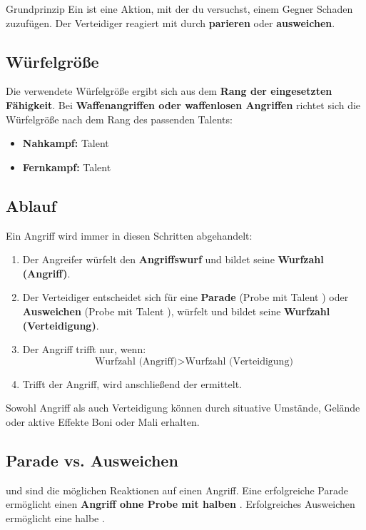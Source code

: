 \begin{rulebox}{Grundprinzip}
	Ein  ist eine Aktion, mit der du versuchst, einem Gegner Schaden zuzufügen.
	Der Verteidiger reagiert mit  durch \textbf{parieren} oder \textbf{ausweichen}.
\end{rulebox}

\subsection*{Würfelgröße}
Die verwendete Würfelgröße ergibt sich aus dem \textbf{Rang der eingesetzten Fähigkeit}.
Bei \textbf{Waffenangriffen oder waffenlosen Angriffen} richtet sich die Würfelgröße nach dem Rang des passenden Talents:
\begin{itemize}
	\item \textbf{Nahkampf:} Talent \textbf{}
	\item \textbf{Fernkampf:} Talent \textbf{}
\end{itemize}

\subsection*{Ablauf}
Ein Angriff wird immer in diesen Schritten abgehandelt:
\begin{enumerate}
	\item Der Angreifer würfelt den \textbf{Angriffswurf} und bildet seine \textbf{Wurfzahl (Angriff)}.
	\item Der Verteidiger entscheidet sich für eine \textbf{Parade} (Probe mit Talent ) oder \textbf{Ausweichen} (Probe mit Talent ), würfelt und bildet seine \textbf{Wurfzahl (Verteidigung)}.
	\item Der Angriff trifft nur, wenn:
	\[
	\text{Wurfzahl (Angriff)} > \text{Wurfzahl (Verteidigung)}
	\]
	\item Trifft der Angriff, wird anschließend der \textbf{} ermittelt.
\end{enumerate}

Sowohl Angriff als auch Verteidigung können durch situative Umstände,
Gelände oder aktive Effekte Boni oder Mali erhalten.

\subsection*{Parade vs. Ausweichen}
 und  sind die möglichen Reaktionen auf einen Angriff. Eine erfolgreiche Parade ermöglicht einen \textbf{Angriff ohne Probe mit halben }. Erfolgreiches Ausweichen ermöglicht eine halbe .

